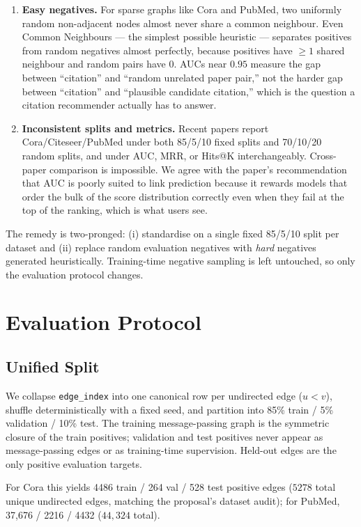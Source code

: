 \documentclass[10pt,a4paper]{article}
\begin{document}
\begin{enumerate}
\item \textbf{Easy negatives.} For sparse graphs like Cora and PubMed,
  two uniformly random non-adjacent nodes almost never share a common
  neighbour. Even Common Neighbours --- the simplest possible heuristic
  --- separates positives from random negatives almost perfectly,
  because positives have $\ge 1$ shared neighbour and random pairs have
  $0$. AUCs near $0.95$ measure the gap between ``citation'' and
  ``random unrelated paper pair,'' not the harder gap between
  ``citation'' and ``plausible candidate citation,'' which is the
  question a citation recommender actually has to answer.
\item \textbf{Inconsistent splits and metrics.} Recent papers report
  Cora/Citeseer/PubMed under both 85/5/10 fixed splits and 70/10/20
  random splits, and under AUC, MRR, or Hits@K interchangeably.
  Cross-paper comparison is impossible. We agree with the paper's
  recommendation that AUC is poorly suited to link prediction because
  it rewards models that order the bulk of the score distribution
  correctly even when they fail at the top of the ranking, which is
  what users see.
\end{enumerate}

The remedy is two-pronged: (i) standardise on a single fixed 85/5/10
split per dataset and (ii) replace random evaluation negatives with
\emph{hard} negatives generated heuristically. Training-time negative
sampling is left untouched, so only the evaluation protocol changes.

\section{Evaluation Protocol}
\label{sec:protocol}

\subsection{Unified Split}
We collapse \texttt{edge\_index} into one canonical row per undirected
edge ($u<v$), shuffle deterministically with a fixed seed, and partition
into 85\% train / 5\% validation / 10\% test. The training
message-passing graph is the symmetric closure of the train positives;
validation and test positives never appear as message-passing edges or
as training-time supervision. Held-out edges are the only positive
evaluation targets.

For Cora this yields 4486 train / 264 val / 528 test positive edges
($5278$ total unique undirected edges, matching the proposal's dataset
audit); for PubMed, 37{,}676 / 2216 / 4432 ($44{,}324$ total).
\end{document}

